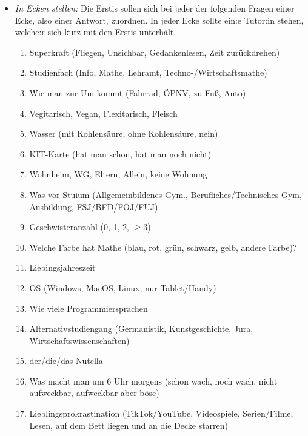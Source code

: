 \documentclass[10pt,twocolumn,ngerman]{scrartcl}
\begin{document}
\begin{itemize}
    \item \emph{In Ecken stellen:} Die Erstis sollen sich bei jeder der
        folgenden Fragen einer Ecke, also einer Antwort, zuordnen. In jeder Ecke
        sollte ein:e Tutor:in stehen, welche:r sich kurz mit den Erstis
        unterhält.
        \begin{enumerate}
            \item Superkraft (Fliegen, Unsichbar, Gedankenlesen, Zeit zurückdrehen)
            \item Studienfach (Info, Mathe, Lehramt, Techno-/Wirtschaftsmathe)
            \item Wie man zur Uni kommt (Fahrrad, ÖPNV, zu Fuß, Auto)
            \item Vegitarisch, Vegan, Flexitarisch, Fleisch
            \item Wasser (mit Kohlensäure, ohne Kohlensäure, nein)
            \item KIT-Karte (hat man schon, hat man noch nicht)
            \item Wohnheim, WG, Eltern, Allein, keine Wohnung
            \item Was vor Stuium (Allgemeinbildenes Gym., Berufliches/Technisches Gym, Ausbildung, FSJ/BFD/FÖJ/FUJ)
            \item Geschwisteranzahl (0, 1, 2, $\geq 3$)
            \item Welche Farbe hat Mathe (blau, rot, grün, schwarz, gelb, andere Farbe)?
            \item Liebingsjahreszeit 
            \item OS (Windows, MacOS, Linux, nur Tablet/Handy)
            \item Wie viele Programmiersprachen
            \item Alternativstudiengang (Germanistik, Kunstgeschichte, Jura, Wirtschaftswissenschaften)
            \item der/die/das Nutella
            \item Was macht man um 6 Uhr morgens (schon wach, noch wach, nicht aufweckbar, aufweckbar aber böse)
            \item Lieblingsprokrastination (TikTok/YouTube, Videospiele, Serien/Filme, Lesen, auf dem Bett liegen und an die Decke starren)
        \end{enumerate}


\end{itemize}
\end{document}
